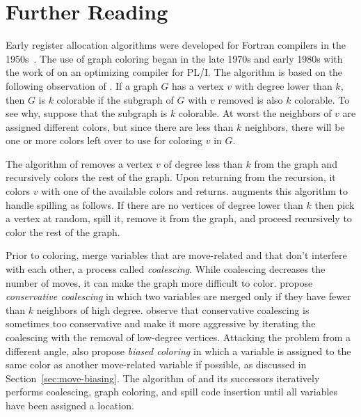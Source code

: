 \documentclass[7x10]{TimesAPriori_MIT}%
\begin{document}


\section{Further Reading}
\label{sec:register-allocation-further-reading}

Early register allocation algorithms were developed for Fortran
compilers in the 1950s~\citep{Horwitz:1966aa,Backus:1978aa}.  The use
of graph coloring began in the late 1970s and early 1980s with the
work of \citet{Chaitin:1981vl} on an optimizing compiler for PL/I. The
algorithm is based on the following observation of
\citet{Kempe:1879aa}. If a graph $G$ has a vertex $v$ with degree
lower than $k$, then $G$ is $k$ colorable if the subgraph of $G$ with
$v$ removed is also $k$ colorable. To see why, suppose that the
subgraph is $k$ colorable.  At worst the neighbors of $v$ are assigned
different colors, but since there are less than $k$ neighbors, there
will be one or more colors left over to use for coloring $v$ in $G$.

The algorithm of \citet{Chaitin:1981vl} removes a vertex $v$ of degree
less than $k$ from the graph and recursively colors the rest of the
graph. Upon returning from the recursion, it colors $v$ with one of
the available colors and returns.  \citet{Chaitin:1982vn} augments
this algorithm to handle spilling as follows. If there are no vertices
of degree lower than $k$ then pick a vertex at random, spill it,
remove it from the graph, and proceed recursively to color the rest of
the graph.

Prior to coloring, \citet{Chaitin:1981vl} merge variables that are
move-related and that don't interfere with each other, a process
called \emph{coalescing}. While coalescing decreases the number of
moves, it can make the graph more difficult to
color. \citet{Briggs:1994kx} propose \emph{conservative coalescing} in
which two variables are merged only if they have fewer than $k$
neighbors of high degree. \citet{George:1996aa} observe that
conservative coalescing is sometimes too conservative and make it more
aggressive by iterating the coalescing with the removal of low-degree
vertices.
%
Attacking the problem from a different angle, \citet{Briggs:1994kx}
also propose \emph{biased coloring} in which a variable is assigned to
the same color as another move-related variable if possible, as
discussed in Section~\ref{sec:move-biasing}.
%
The algorithm of \citet{Chaitin:1981vl} and its successors iteratively
performs coalescing, graph coloring, and spill code insertion until
all variables have been assigned a location.
\end{document}
